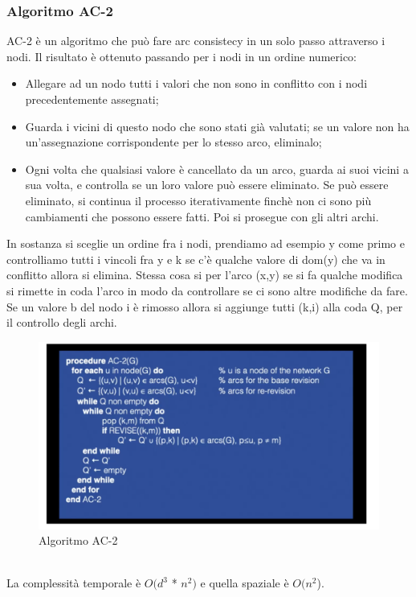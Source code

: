 \subsubsection{Algoritmo AC-2}
AC-2 è un algoritmo che può fare arc consistecy in un solo passo attraverso i nodi. Il risultato è ottenuto passando per i nodi in un ordine numerico:
\begin{itemize}
    \item Allegare ad un nodo tutti i valori che non sono in conflitto con i nodi precedentemente assegnati;
    \item Guarda i vicini di questo nodo che sono stati già valutati; se un valore non ha un’assegnazione corrispondente per lo stesso arco, eliminalo;
    \item Ogni volta che qualsiasi valore è cancellato da un arco, guarda ai suoi vicini a sua volta, e controlla se un loro valore può essere eliminato. Se può essere eliminato, si continua il processo iterativamente finchè non ci sono più cambiamenti che possono essere fatti. Poi si prosegue con gli altri archi.
\end{itemize}
In sostanza si sceglie un ordine fra i nodi, prendiamo ad esempio y come primo e controlliamo tutti i vincoli fra y e k se c’è qualche valore di dom(y) che va in conflitto allora si elimina. Stessa cosa si per l’arco (x,y) se si fa qualche modifica si rimette in coda l’arco in modo da controllare se ci sono altre modifiche da fare. Se un valore b del nodo i è rimosso allora si aggiunge tutti (k,i) alla coda Q, per il controllo degli archi.
\begin{figure}[htp]
	\centering
    \includegraphics[width=13cm, keepaspectratio]{img/Cap3/ac-2.png}
    \caption{Algoritmo AC-2}
\end{figure}
\\La complessità temporale è $O(d^3$ * $n^2)$ e quella spaziale è $O(n^2$).

